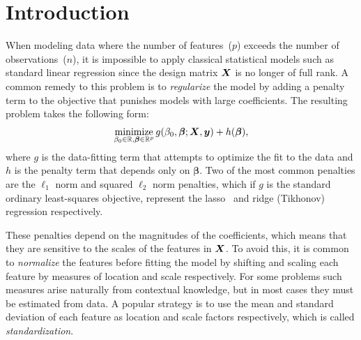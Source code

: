 \section{Introduction}

When modeling data where the number of features~(\(p\)) exceeds the number of
observations~(\(n\)), it is impossible to apply classical statistical models such as
standard linear regression since the design matrix \(\bm X\) is no longer of full rank. A
common remedy to this problem is to \emph{regularize} the model by adding a penalty term to
the objective that punishes models with large coefficients. The resulting problem takes the
following form:
\begin{equation}
  \label{eq:general-objective}
  \operatorname*{minimize}_{\beta_0 \in \mathbb{R},\bm{\beta} \in \mathbb{R}^p} g(\beta_0, \bm\beta; \bm X, \bm y) + h(\bm\beta),
\end{equation}
%
where \(g\) is the data-fitting term that attempts to optimize the fit to the data and
\(h\) is the penalty term that depends only on \(\bm{\beta}\). Two of the most common
penalties are the \(\ell_1\) norm and squared \(\ell_2\) norm penalties, which if \(g\) is
the standard ordinary least-squares objective, represent the
lasso~\citep{tibshirani1996,santosa1986,donoho1994} and ridge (Tikhonov) regression
respectively.

These penalties depend on the magnitudes of the coefficients, which means that they are
sensitive to the scales of the features in \(\bm X\). To avoid this, it is common to
\emph{normalize} the features before fitting the model by shifting and scaling each feature
by measures of location and scale respectively. For some problems such measures arise
naturally from contextual knowledge, but in most cases they must be estimated from data. A
popular strategy is to use the mean and standard deviation of each feature as location and
scale factors respectively, which is called \emph{standardization}.

